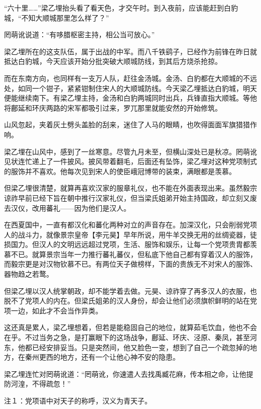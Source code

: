 “六十里……”梁乙埋抬头看了看天色，才交午时。到入夜前，应该能赶到白豹城，“不知大顺城那里怎么样了？”

罔萌讹说道：“有哆腊枢密主持，相公当可放心。”

梁乙埋所在的这支队伍，属于出战的中军。而八千铁鹞子，已经作为前锋在昨日就抵达白豹城，今天应该开始分批突破大顺城防线，到其后方烧杀抢掠。

而在东南方向，也同样有一支万人队，赶往金汤城。金汤、白豹都在大顺城的不远处，如同一个钳子，紧紧钳制住宋人的大顺城防线。今天梁乙埋抵达白豹城，明天便能继续南下。有梁乙埋主持，金汤和白豹两城同时出兵，兵锋直指大顺城。等他将鄜延和环庆两路的宋军都吸引过来，罗兀那里就能安然的开始修筑。

山风忽起，夹着灰土劈头盖脸的刮来，迷住了人马的眼睛，也吹得面面军旗猎猎作响。

梁乙埋在山风中，感到了一丝寒意。尽管九月未至，但横山深处已是秋凉。罔萌讹见状连忙递上了一件披风。披风带着翻毛，后面还有坠饰，梁乙埋对这种党项制式的服饰并不喜欢。他每次见到宋人的使臣峨冠博带的装束，满眼都是羡慕。

但梁乙埋很清楚，就算再喜欢汉家的服章礼仪，也不能在外面表现出来。虽然毅宗谅祚早前已经下旨在朝中推行汉家礼仪，但当梁氏姐弟开始主持国政，却立刻又废去汉仪，改用蕃礼——因为他们是汉人。

在西夏国中，一直有都汉化和蕃化两种对立的声音存在。加深汉化，只会削弱党项人的战斗力，就像景宗皇帝【李元昊】早年所说，用牛羊交换无用的丝绸瓷器，徒损国力。但汉人的文明远远超过党项，生活、服饰和娱乐，让每一个党项贵胄都羡慕不已。就算景宗当年一力推行蕃礼蕃仪，但私底下他自己都有穿着汉人的服饰，而毅宗更是对汉物钦慕不已。有两位天子做榜样，下面的贵族无不对宋人的服饰、器物趋之若鹜。

但梁乙埋以汉人统掌朝政，却不能学着去做。元昊、谅祚穿了再多汉人的衣服，也脱不了党项人的内在。但梁氏姐弟的汉人身份，却会让他们必须旗帜鲜明的站在党项一边，如此才不会当作异类。

这还真是累人，梁乙埋想着，但若是能稳固自己的地位，就算茹毛饮血，他也不会在乎。不过当务之急，是打赢眼下的这场战争，鄜延、环庆、泾原、秦凤，甚至河东，他都已经安排妥当。只是突然间，他又脸色一变，想到了自己一个疏忽掉的地方，在秦州更西的地方，还有一个让他心神不安的隐患。

梁乙埋连忙对罔萌讹道：“罔萌讹，你速遣人去找禹臧花麻，传本相之命，让他提防河湟，不得疏忽！”

注１：党项语中对天子的称呼，汉义为青天子。

